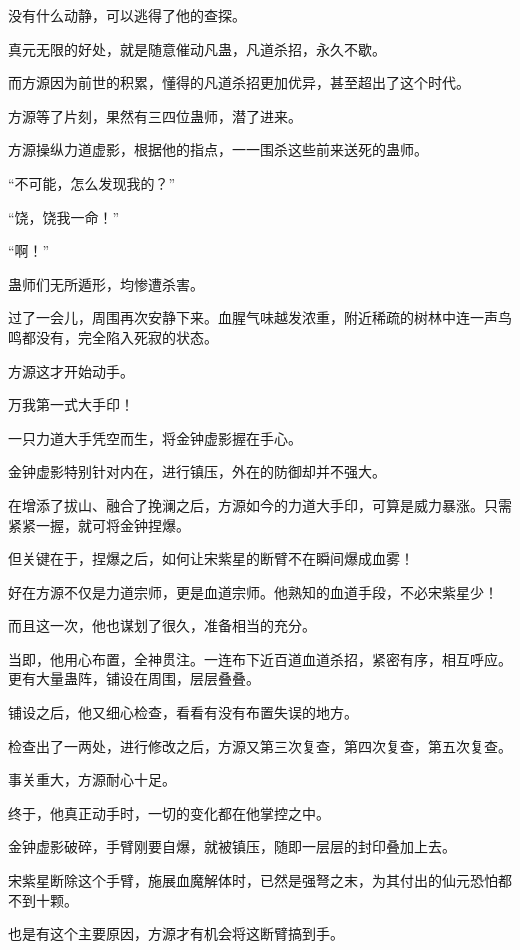\begin{this_body}
没有什么动静，可以逃得了他的查探。

真元无限的好处，就是随意催动凡蛊，凡道杀招，永久不歇。

而方源因为前世的积累，懂得的凡道杀招更加优异，甚至超出了这个时代。

方源等了片刻，果然有三四位蛊师，潜了进来。

方源操纵力道虚影，根据他的指点，一一围杀这些前来送死的蛊师。

“不可能，怎么发现我的？”

“饶，饶我一命！”

“啊！”

蛊师们无所遁形，均惨遭杀害。

过了一会儿，周围再次安静下来。血腥气味越发浓重，附近稀疏的树林中连一声鸟鸣都没有，完全陷入死寂的状态。

方源这才开始动手。

万我第一式大手印！

一只力道大手凭空而生，将金钟虚影握在手心。

金钟虚影特别针对内在，进行镇压，外在的防御却并不强大。

在增添了拔山、融合了挽澜之后，方源如今的力道大手印，可算是威力暴涨。只需紧紧一握，就可将金钟捏爆。

但关键在于，捏爆之后，如何让宋紫星的断臂不在瞬间爆成血雾！

好在方源不仅是力道宗师，更是血道宗师。他熟知的血道手段，不必宋紫星少！

而且这一次，他也谋划了很久，准备相当的充分。

当即，他用心布置，全神贯注。一连布下近百道血道杀招，紧密有序，相互呼应。更有大量蛊阵，铺设在周围，层层叠叠。

铺设之后，他又细心检查，看看有没有布置失误的地方。

检查出了一两处，进行修改之后，方源又第三次复查，第四次复查，第五次复查。

事关重大，方源耐心十足。

终于，他真正动手时，一切的变化都在他掌控之中。

金钟虚影破碎，手臂刚要自爆，就被镇压，随即一层层的封印叠加上去。

宋紫星断除这个手臂，施展血魔解体时，已然是强弩之末，为其付出的仙元恐怕都不到十颗。

也是有这个主要原因，方源才有机会将这断臂搞到手。

\end{this_body}

